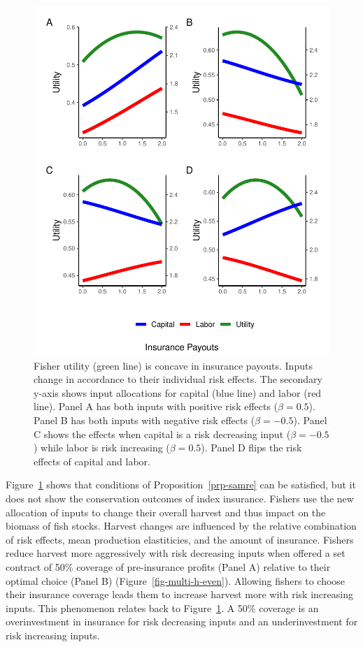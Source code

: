 \documentclass[
  super,
  preprint,
  3p]{elsarticle}
\theoremstyle{plain}
\theoremstyle{plain}
\theoremstyle{remark}
\begin{document}
\begin{figure}

{\centering \includegraphics{index-bc_files/figure-pdf/fig-ins-1.pdf}

}

\caption{\label{fig-ins}Fisher utility (green line) is concave in
insurance payouts. Inputs change in accordance to their individual risk
effects. The secondary y-axis shows input allocations for capital (blue
line) and labor (red line). Panel A has both inputs with positive risk
effects (\(\beta=0.5\)). Panel B has both inputs with negative risk
effects (\(\beta=-0.5\)). Panel C shows the effects when capital is a
risk decreasing input (\(\beta=- 0.5\)) while labor is risk increasing
(\(\beta=0.5\)). Panel D flips the risk effects of capital and labor.}

\end{figure}

Figure~\ref{fig-ins} shows that conditions of
Proposition~\ref{prp-samre} can be satisfied, but it does not show the
conservation outcomes of index insurance. Fishers use the new allocation
of inputs to change their overall harvest and thus impact on the biomass
of fish stocks. Harvest changes are influenced by the relative
combination of risk effects, mean production elastiticies, and the
amount of insurance. Fishers reduce harvest more aggressively with risk
decreasing inputs when offered a set contract of 50\% coverage of
pre-insurance profits (Panel A) relative to their optimal choice (Panel
B) (Figure~\ref{fig-multi-h-even}). Allowing fishers to choose their
insurance coverage leads them to increase harvest more with risk
increasing inputs. This phenomenon relates back to Figure~\ref{fig-ins}.
A 50\% coverage is an overinvestment in insurance for risk decreasing
inputs and an underinvestment for risk increasing inputs.
\end{document}
